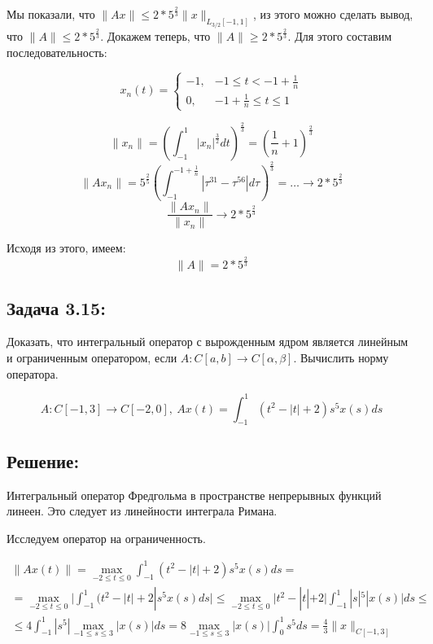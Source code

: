 \documentclass[12pt, a4paper]{report}
\begin{document}
Мы показали, что $\| A x \| \le 2*5^{\frac{2}{3}} \| x \|_{L_{3/2}[-1, 1]}$, из 
этого можно сделать вывод, что $\|A\| \le 2*5^{\frac{2}{3}}$. Докажем теперь, что
$\| A \| \ge 2*5^{\frac{2}{3}}$. Для этого составим последовательность:

\begin{equation*}
    x_n(t) =
    \begin{cases}
        - 1, & - 1 \le t < - 1 + \frac{1}{n}\\
        0, & - 1 + \frac{1}{n} \le t \le 1
    \end{cases}
\end{equation*}

\[\| x_n \| = \left( \int_{ - 1}^{1} |x_n|^\frac{3}{2} dt \right)^\frac{2}{3} = 
\left( \frac{1}{n} + 1 \right)^\frac{2}{3}\]
\[ \|Ax_n\| = 5^\frac{2}{5} \left(\int_{ - 1}^{ - 1 + \frac{1}{n}} |\tau^{31} - \tau^{56}| d\tau \right)^\frac{2}{3} =
\dots \to 2 * 5^\frac{2}{3}\]
\[\frac{\| Ax_n \|}{\| x_n\|} \to 2*5^\frac{2}{3}\]

Исходя из этого, имеем:
\[\| A \| = 2*5^{\frac{2}{3}}\]

\subsection*{Задача 3.15:}
Доказать, что интегральный оператор с вырожденным ядром является линейным и ограниченным оператором, если $A: C[a, b] \to C[\alpha, \beta]$. Вычислить норму оператора.

\[A: C[-1, 3] \to C[-2, 0],\ Ax(t) = \int_{-1}^{1}(t^2 - |t| + 2)s^5 x(s)ds\]

\subsection*{Решение:}

Интегральный оператор Фредгольма в пространстве непрерывных функций линеен.
Это следует из линейности интеграла Римана.

Исследуем оператор на ограниченность.

\begin{gather*}
\| Ax(t) \| = \max_{ - 2 \le t \le 0} \int_{ - 1}^{1} (t^2 - |t| + 2)s^5 x(s) ds =\\
=\max_{ - 2\le t \le 0} \Big| \int_{ - 1}^{1} (t^2 - |t| + 2| s^5 x(s) ds \Big| \le 
\max_{ - 2 \le t \le 0} \Big| t^2 - |t| + 2 \Big| \int_{ - 1}^{1} |s|^5 |x(s)|ds \le\\
\le 4 \int_{ - 1}^{1} |s^5| \max_{ - 1 \le s \le 3} |x(s) | ds = 
8 \max_{ - 1 \le s \le 3} |x(s)| \int_{0}^{1} s^5 ds =
\frac{4}{3} \| x \|_{C[ - 1, 3]}
\end{gather*}
\end{document}
